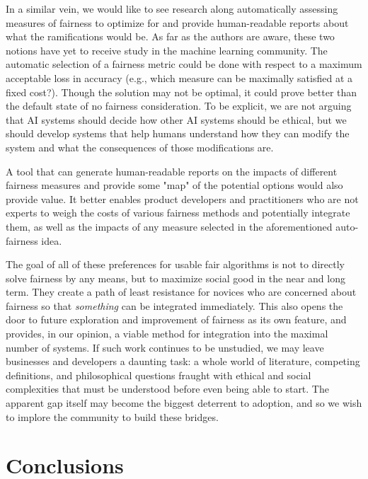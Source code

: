 \documentclass[11pt]{article}
\begin{document}
In a similar vein, we would like to see research along automatically assessing measures of fairness to optimize for and provide human-readable reports about what the ramifications would be. As far as the authors are aware, these two notions have yet to receive study in the machine learning community. 
The automatic selection of a fairness metric could be done with respect to a maximum acceptable loss in accuracy (e.g., which measure can be maximally satisfied at a fixed cost?). Though the solution may not be optimal, it could prove better than the default state of no fairness consideration. To be explicit, we are not arguing that AI systems should decide how other AI systems should be ethical, but we should develop systems that help humans understand how they can modify the system and what the consequences of those modifications are. 

A tool that can generate human-readable reports on the impacts of different fairness measures and provide some "map" of the potential options would also provide value. It better enables product developers and practitioners who are not experts to weigh the costs of various fairness methods and potentially integrate them, as well as the impacts of any measure selected in the aforementioned auto-fairness idea.

The goal of all of these preferences for usable fair algorithms is not to directly solve fairness by any means, but to maximize social good in the near and long term. They create a path of least resistance for novices who are concerned about fairness so that \textit{something} can be integrated immediately.  This also opens the door to future exploration and improvement of fairness as its own feature, and provides, in our opinion, a viable method for integration into the maximal number of systems. If such work continues to be unstudied, we may leave businesses and developers a daunting task: a whole world of literature, competing definitions, and philosophical questions fraught with ethical and social complexities that must be understood before even being able to start. The apparent gap itself may become the biggest deterrent to adoption, and so we wish to implore the community to build these bridges. 

\section{Conclusions} \label{sec:conclusion}
\end{document}

